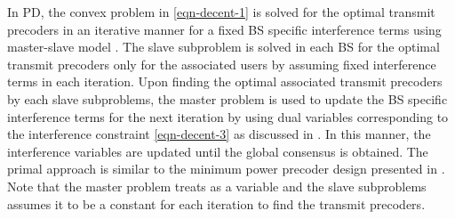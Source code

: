 
In \acl{PD}, the convex problem in \eqref{eqn-decent-1} is solved for the optimal transmit precoders in an iterative manner for a fixed \ac{BS} specific interference terms  using master-slave model \cite{pennanen2011decentralized}. The slave subproblem is solved in each \ac{BS} for the optimal transmit precoders only for the associated users by assuming fixed interference terms  in each  iteration. Upon finding the optimal associated transmit precoders by each slave subproblems, the master problem is used to update the \ac{BS} specific interference terms  for the next iteration by using dual variables corresponding to the interference constraint \eqref{eqn-decent-3} as discussed in \cite{pennanen2011decentralized}. In this manner, the interference variables are updated until the global consensus is obtained. The primal approach is similar to the minimum power precoder design presented in \cite{pennanen2011decentralized}. Note that the master problem treats  as a variable and the slave subproblems assumes it to be a constant for each iteration to find the transmit precoders.

\begin{comment}
The \acl{PD} approach decomposes the problem by fixing the interference variables \me{\zeta_{l,k,n,b} \forall k,b} in order to perform the precoder design independently across each \ac{BS}. Once the optimal precoders are designed at each \ac{BS} with the fixed interference constraints \eqref{eqn-decent-3}, the dual variables corresponding to the interference constraints are exchanged between the cooperating \acp{BS} in \me{\mc{B}} to update the interference variables \me{\zeta_{l,k,n,b}} for the next iteration until convergence. The primal approach is discussed extensively for the min-power problem in \cite{pennanen2011decentralized} and much of the current work follows similar approach. 

\subsubsection*{Convergence}
The convergence of the primal decomposition is similar to that of the centralized problem if the interference variables \me{\zeta_{l,k,n,b}} are allowed to converge to a stationary point. In practice, we can limit the number of exchanges to \me{J_{\max}} after which the \ac{SCA} update is performed until convergence or for \me{I_{\max}} times. The update of \me{\tilde{p}_{l,k,n}, \tilde{q}_{l,k,n}} and \me{\tilde{\beta}_{l,k,n}} can be made in conjunction with the receiver update \me{\mvec{W}{k,n}}. The receiver update can be made by using the precoded pilot transmission from each user as in \cite{komulainen2013effective}. 
\end{comment}